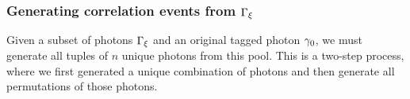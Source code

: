

\subsubsection{Generating correlation events from $\Gamma_{\xi}$}
Given a subset of photons $\Gamma_{\xi}$ and an original tagged photon $\gamma_{0}$, we must generate all tuples of $n$ unique photons from this pool. This is a two-step process, where we first generated a unique combination of photons and then generate all permutations of those photons.

